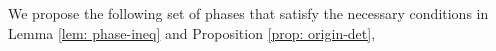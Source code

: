 \begin{comment}
{\it Remark.} In Lemma \ref{lem: phase-ineq}, $\Msub[:,1]$ and $\Msub[:,6]$ being independent only guarantees $\det(\Msub[-k_{\V{\omega}},:])\neq 0$. However, \eqref{eq: m0-cramer} implies that $|m_0(\V{\omega})|\propto \det(\Msub[-k_{\V{\omega}},:])$ hence it is preferred to maximize the determinant. Since
\begin{align*}
\det(\Msub[-k_{\V{\omega}}, :]) = \det\big(\big[\, \Msub[-k_{\V{\omega}},-6], \;\Msub[-k_{\V{\omega}},6] + c \cdot\Msub[-k_{\V{\omega}},1]  \,\big]\big),\quad 
\end{align*}
$\forall c\in \mathbb{C}$, the angle between $\Msub[:,1]$ and $\Msub[:,6]$ should be maximized.
Therefore, a stronger condition than ({\bf c1.1}) is to require $\Msub[:,1]$ and $\Msub[:,6]$ be orthogonal, which is equivalent to 
\begin{align*}
(\V{\eta}_1-\V{\eta}_6)^\top(\pi/2, \pi/2) = \pi \,(\text{mod}\, 2\pi).\tag{\bf c2.1}
\end{align*}
The stronger condition corresponding to ({\bf c1.2}) is 
\begin{align*}
(\V{\eta}_3-\V{\eta}_4)^\top(-\pi/2,\pi/2)=\pi(\text{mod},\,2\pi).\tag{\bf c2.2}
\end{align*} %


Unfortunately, Proposition \ref{prop: origin-det} prevents ({\bf c2.1}) and ({\bf c2.2}) from holding simultaneously.
\end{comment}
We propose the following set of phases that satisfy the necessary conditions in Lemma \ref{lem: phase-ineq} and Proposition \ref{prop: origin-det},
